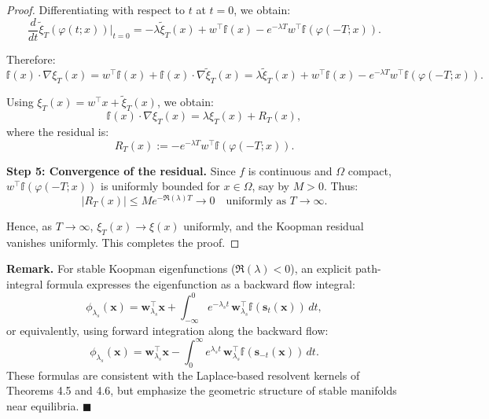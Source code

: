 \documentclass[11pt]{article}
\theoremstyle{plain}
\newenvironment{remark}
  {\par\noindent\textbf{Remark. }\normalfont}
  {\hfill$\blacksquare$\par}
\def\[{\begin{equation}}
\def\]{\end{equation}}
\begin{document}
\begin{proof}
Differentiating with respect to \( t \) at \( t = 0 \), we obtain:
\[
\frac{d}{dt} \tilde{\xi}_T(\varphi(t; x)) \bigg|_{t = 0}
= -\lambda \tilde{\xi}_T(x) + w^\top {\mathbb f}(x) - e^{-\lambda T} w^\top {\mathbb f}(\varphi(-T; x)).
\]

Therefore:
\[
{\mathbb f}(x) \cdot \nabla \xi_T(x) = w^\top {\mathbb f}(x) + {\mathbb f}(x) \cdot \nabla \tilde{\xi}_T(x)
= \lambda \tilde{\xi}_T(x) + w^\top {\mathbb f}(x) - e^{-\lambda T} w^\top {\mathbb f}(\varphi(-T; x)).
\]

Using \( \xi_T(x) = w^\top x + \tilde{\xi}_T(x) \), we obtain:
\[
{\mathbb f}(x) \cdot \nabla \xi_T(x) = \lambda \xi_T(x) + R_T(x),
\]
where the residual is:
\[
R_T(x) := -e^{-\lambda T} w^\top {\mathbb f}(\varphi(-T; x)).
\]

\medskip

\textbf{Step 5: Convergence of the residual.}  
Since \( f \) is continuous and \( \Omega \) compact, \( w^\top {\mathbb f}(\varphi(-T; x)) \) is uniformly bounded for \( x \in \Omega \), say by \( M > 0 \). Thus:
\[
|R_T(x)| \le M e^{-\Re(\lambda) T} \to 0 \quad \text{uniformly as } T \to \infty.
\]

Hence, as \( T \to \infty \), \( \xi_T(x) \to \xi(x) \) uniformly, and the Koopman residual vanishes uniformly. This completes the proof.
\end{proof}
\begin{remark}
For stable Koopman eigenfunctions (\( \Re (\lambda) < 0 \)), an explicit path-integral formula expresses the eigenfunction as a backward flow integral:
\[
\phi_{\lambda_s}(\mathbf{x}) = \mathbf{w}_{\lambda_s}^\top \mathbf{x}
+ \int_{-\infty}^0 e^{-\lambda_s t} \, \mathbf{w}_{\lambda_s}^\top \mathbb{f}(\mathbf{s}_{t}(\mathbf{x})) \, dt,
\]
or equivalently, using forward integration along the backward flow:
\[
\phi_{\lambda_s}(\mathbf{x}) = \mathbf{w}_{\lambda_s}^\top \mathbf{x}
- \int_0^\infty e^{\lambda_s t} \, \mathbf{w}_{\lambda_s}^\top \mathbb{f}(\mathbf{s}_{-t}(\mathbf{x})) \, dt.
\]
These formulas are consistent with the Laplace-based resolvent kernels of Theorems 4.5 and 4.6, but emphasize the geometric structure of stable manifolds near equilibria.
\end{remark}
\end{document}
